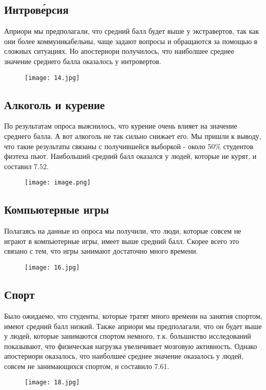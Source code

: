 \documentclass[a4paper,12pt]{article}
\begin{document}
\subsection{Интрове́рсия}
Априори мы предполагали, что средний балл будет выше у экстравертов, так как они более коммуникабельны, чаще задают вопросы и обращаются за помощью в сложных ситуациях. Но апостериори получилось, что наиболшее среднее значение среднего балла оказалось у интровертов.  
\begin{figure}[h!]\centering
    \texttt{[image: 14.jpg]}
    \label{1_1}
\end{figure}

\subsection{Алкоголь и курение}
По результатам опроса выяснилось, что курение очень влияет на значение среднего балла. А вот алкоголь не так сильно снижает его. Мы пришли к выводу, что такие результаты связаны с получившейся выборкой - около 50$\%$ студентов физтеха пьют. Наибольший средний балл оказался у людей, которые не курят, и составил $7.52$.
\begin{figure}[h!]\centering
    \texttt{[image: image.png]}
    \label{1_1}
\end{figure}
\newpage
\subsection{Компьютерные игры}
Полагаясь на данные из опроса мы получили, что люди, которые совсем не играют в компьютерные игры, имеет выше средний балл. Скорее всего это связано с тем, что игры занимают достаточно много времени.
\begin{figure}[h!]\centering
    \texttt{[image: 16.jpg]}
    \label{1_1}
\end{figure}

\subsection{Спорт}
Было ожидаемо, что студенты, которые тратят много времени на занятия спортом, имеют средний балл низкий. Также априори мы предполагали, что он будет выше у людей, которые занимаются спортом немного, т.к. большиство исследований показывают, что физическая нагрузка увеличивает мозговую активность. Однако апостериори оказалось, что наиболшее среднее значение оказалось у людей, совсем не занимающихся спортом, и составило 7.61.
\begin{figure}[h!]\centering
    \texttt{[image: 18.jpg]}
    \label{1_1}
\end{figure}
\newpage
\end{document}
